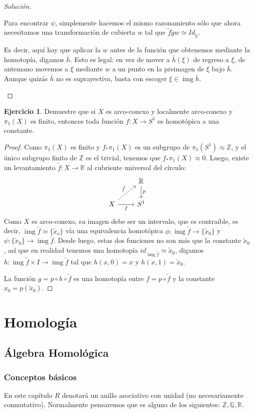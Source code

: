 \documentclass[spanish]{book}
\theoremstyle{definition}
\newtheorem*{ejer}{Ejercicio}
\newcommand{\R}{\mathbb{R}}
\newcommand{\Z}{\mathbb{Z}}
\newcommand{\Q}{\mathbb{Q}}
\DeclareMathOperator{\img}{img}
\begin{document}
\begin{proof}[Solución]
\begin{enumerate}
		Para encontrar $\psi$, simplemente hacemos el mismo razonamiento sólo que ahora necesitamos una transformación de cubierta $w$ tal que $\tilde{f}\tilde{g}w\simeq Id_{\tilde{Y}}$.
		
		Es decir, aquí hay que aplicar la $w$ antes de la función que obtenemos mediante la homotopía, digamos $\bar{h}$. Esto es legal: en vez de mover a $\bar{h}(\xi)$ de regreso a $\xi$, de antemano movemos a $\xi$ mediante $w$ a un punto en la preimagen de $\xi$ bajo $\bar{h}$. Aunque quizás $\bar{h}$ no es suprayectiva, basta con escoger $\xi\in\img\bar{h}$.
	\end{enumerate}
\end{proof}
\begin{ejer}
	Demuestre que si $X$ es arco-conexo y localmente arco-conexo y $\pi_1(X)$ es finito, entonces toda función $f:X\to S^1$ es homotópica a una constante.
\end{ejer}
\begin{proof}
	Como $\pi_1(X)$ es finito y $f_*\pi_1(X)$ es un subgrupo de $\pi_1(S^1)\approx\Z$, y el único subgrupo finito de $\Z$ es el trivial, tenemos que $f_*\pi_1(X)\approx0$. Luego, existe un levantamiento $\tilde{f}:X\to\R$ al cubriente universal del círculo:
	\[\begin{tikzcd}
		&\R\arrow[d,"p"]\\
		X\arrow[ur,dashed,"\tilde{f}"]\arrow[r,swap,"f"]&S^1
	\end{tikzcd}\]
	Como $X$ es arco-conexo, su imagen debe ser un intervalo, que es contraible, es decir, $\img\tilde{f}\simeq\{\tilde{x}_o\}$ vía una equivalencia homotópica $\phi:\img\tilde{f}\to\{\tilde{x}_0\}$ y $\psi:\{\tilde{x}_0\}\to\img\tilde{f}$. Desde luego, estas dos funciones no son más que la constante $\tilde{x}_0$, así que en realidad tenemos una homotopía $id_{\img\tilde{f}}\simeq\tilde{x}_0$, digamos $h:\img\tilde{f}\times I\to \img\tilde{f}$ tal que $h(x,0)=x$ y $h(x,1)=\tilde{x}_0$.
	
	La función $g=p\circ h\circ\tilde{f}$ es una homotopía entre $f=p\circ\tilde{f}$ y la constante $x_0=p(\tilde{x}_0)$.
\end{proof}
\part{Homología}
\chapter{Álgebra Homológica}
\section{Conceptos básicos}
	En este capítulo $R$ denotará un anillo asociativo con unidad (no necesariamente conmutativo). Normalmente pensaremos que es alguno de los siguientes: $\Z, \Q, \R$.
	
\end{document}
